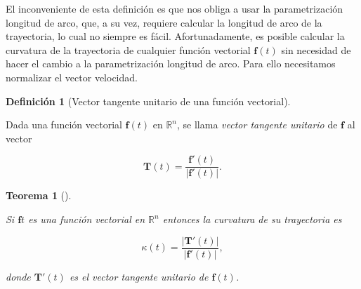 \documentclass[
  a4paper,
]{scrreport}
\theoremstyle{plain}
\newtheorem{theorem}{Teorema}[chapter]
\theoremstyle{plain}
\theoremstyle{definition}
\newtheorem{definition}{Definición}[chapter]
\theoremstyle{definition}
\theoremstyle{plain}
\theoremstyle{remark}
\begin{document}
El inconveniente de esta definición es que nos obliga a usar la
parametrización longitud de arco, que, a su vez, requiere calcular la
longitud de arco de la trayectoria, lo cual no siempre es fácil.
Afortunadamente, es posible calcular la curvatura de la trayectoria de
cualquier función vectorial \(\mathbf{f}(t)\) sin necesidad de hacer el
cambio a la parametrización longitud de arco. Para ello necesitamos
normalizar el vector velocidad.

\begin{definition}[Vector tangente unitario de una función
vectorial]\protect\hypertarget{def-vector-tangente-unitario}{}\label{def-vector-tangente-unitario}

Dada una función vectorial \(\mathbf{f}(t)\) en \(\mathbb{R}^n\), se
llama \emph{vector tangente unitario} de \(\mathbf{f}\) al vector

\[
\mathbf{T}(t) = \frac{\mathbf{f}'(t)}{|\mathbf{f}'(t)|}.
\]

\end{definition}

\begin{theorem}[]\protect\hypertarget{thm-curvatura-trayectoria}{}\label{thm-curvatura-trayectoria}

Si \(\mathbf{f}{t}\) es una función vectorial en \(\mathbb{R}^n\)
entonces la curvatura de su trayectoria es

\[
\kappa(t) = \frac{|\mathbf{T}'(t)|}{|\mathbf{f}'(t)|},
\]

donde \(\mathbf{T}'(t)\) es el vector tangente unitario de
\(\mathbf{f}(t)\).

\end{theorem}
\end{document}
